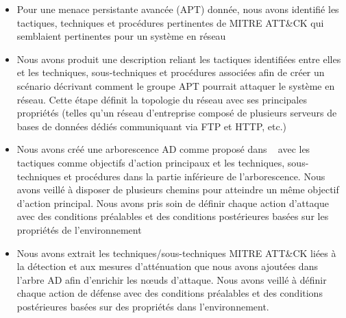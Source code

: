 \begin{itemize}
    \item Pour une menace persistante avancée (APT) donnée, nous avons identifié les tactiques, techniques et procédures pertinentes de MITRE ATT\&CK qui semblaient pertinentes pour un système en réseau

    \item Nous avons produit une description reliant les tactiques identifiées entre elles et les techniques, sous-techniques et procédures associées afin de créer un scénario décrivant comment le groupe APT pourrait attaquer le système en réseau. Cette étape définit la topologie du réseau avec ses principales propriétés
          (telles qu'un réseau d'entreprise composé de plusieurs serveurs de bases de données dédiés communiquant via FTP et HTTP, etc.)

    \item Nous avons créé une arborescence AD comme proposé dans ~\cite{BKordy2010} avec les tactiques comme objectifs d'action principaux et les techniques, sous-techniques et procédures dans la partie inférieure de l'arborescence. Nous avons veillé à disposer de plusieurs chemins pour atteindre un même objectif d'action principal. Nous avons pris soin de définir chaque action d'attaque avec des conditions préalables et des conditions postérieures basées sur les propriétés de l'environnement

    \item Nous avons extrait les techniques/sous-techniques MITRE ATT\&CK liées à la détection et aux mesures d'atténuation que nous avons ajoutées dans l'arbre AD afin d'enrichir les nœuds d'attaque. Nous avons veillé à définir chaque action de défense avec des conditions préalables et des conditions postérieures basées sur des propriétés dans l'environnement.


\end{itemize}
